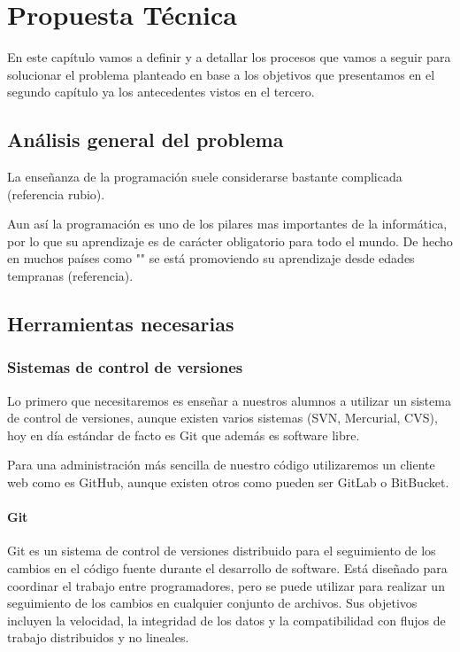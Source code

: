 \chapter{Propuesta Técnica}

En este capítulo vamos a definir y a detallar los procesos que vamos a seguir para solucionar el problema planteado en base a los objetivos que presentamos en el segundo capítulo ya los antecedentes vistos en el tercero.

\section{Análisis general del problema}

La enseñanza de la programación suele considerarse bastante complicada (referencia rubio).

Aun así la programación es uno de los pilares mas importantes de la informática, por lo que su aprendizaje es de carácter obligatorio para todo el mundo. De hecho en muchos países como "" se está promoviendo su aprendizaje desde edades tempranas (referencia).

\section{Herramientas necesarias}

\subsection{Sistemas de control de versiones}

Lo primero que necesitaremos es enseñar a nuestros alumnos a utilizar un sistema de control de versiones, aunque existen varios sistemas (SVN, Mercurial, CVS), hoy en día estándar de facto es Git que además es software libre.

Para una administración más sencilla de nuestro código utilizaremos un cliente web como es GitHub, aunque existen otros como pueden ser GitLab o BitBucket.

\subsubsection {Git}

Git es un sistema de control de versiones distribuido para el seguimiento de los cambios en el código fuente durante el desarrollo de software. Está diseñado para coordinar el trabajo entre programadores, pero se puede utilizar para realizar un seguimiento de los cambios en cualquier conjunto de archivos.  Sus objetivos incluyen la velocidad, la integridad de los datos y la compatibilidad con flujos de trabajo distribuidos y no lineales.

